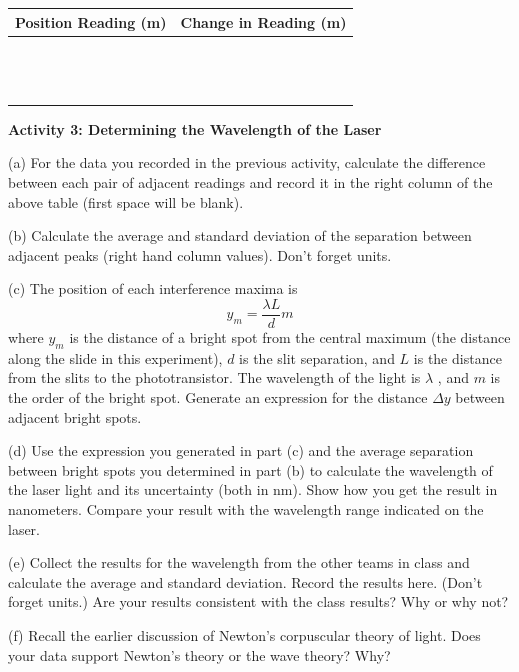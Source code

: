 \vspace{0.3cm}
{\centering \begin{tabular}{|c|c|}
\hline 
Position Reading (m)&
Change in Reading (m)\\
\hline
\hline 
&
\\
\hline 
&
\\
\hline 
&
\\
\hline 
&
\\
\hline 
&
\\
\hline 
&
\\
\hline 
&
\\
\hline
&
\\
\hline
&
\\
\hline
&
\\
\hline
&
\\
\hline
&
\\
\hline
&
\\
\hline
\end{tabular}\par}
\vspace{0.3cm}

\textbf{Activity 3: Determining the Wavelength of the Laser }

(a) For the data you recorded in the previous activity, calculate the 
difference between each pair of adjacent readings and record it in the 
right column of the above table (first space will be blank).

(b) Calculate the average and standard deviation of the separation between 
adjacent peaks (right hand column values). Don't forget units.
\vspace{15mm}

(c) The position of each interference maxima is
$$
y_{m}=\frac{\lambda L}{d}m
$$
where $y_{m}$ is the distance of a bright spot from the central
maximum (the distance along the slide in this experiment),
$d$ is the slit separation, and $L$ is
the distance from the slits to the phototransistor. 
The wavelength of the light is \( \lambda  \) ,
and $m$ is the order of the bright spot. 
Generate an expression for
the distance $\Delta y$ between adjacent bright spots.
\vspace{20mm}

(d) Use the expression you generated in part (c) and the average separation
between bright spots you determined in part (b) to calculate the wavelength of 
the laser light and its uncertainty (both in nm). Show how you get the result 
in nanometers. Compare your result with the wavelength range indicated on the 
laser.
\vspace{30mm}

(e) Collect the results for the wavelength from the other teams in class
and calculate the average and standard deviation. Record the results here. 
(Don't forget units.)
Are your results consistent with the class results? Why or why not?
\vspace{15mm}

(f) Recall the earlier discussion of Newton's corpuscular theory of
light. Does your data support Newton's theory or the wave theory?
Why?\vspace{15mm}

